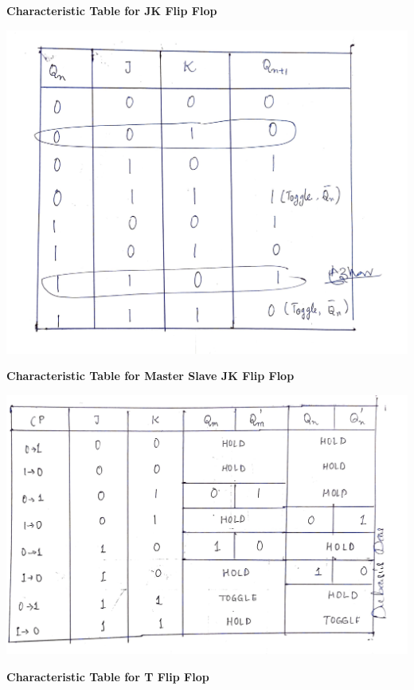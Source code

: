 \clearpage
\begin{center}
    \textbf{Characteristic Table for JK Flip Flop}
\end{center}
\begin{center}
    \includegraphics[scale = 0.15]{Documents/tabjk_1.jpg}
\end{center}
\begin{center}
    \textbf{Characteristic Table for Master Slave JK Flip Flop}
\end{center}
\begin{center}
    \includegraphics[scale = 0.19]{Documents/tabms_1.jpg}
\end{center}
\clearpage
\begin{center}
    \textbf{Characteristic Table for T Flip Flop}
\end{center}
